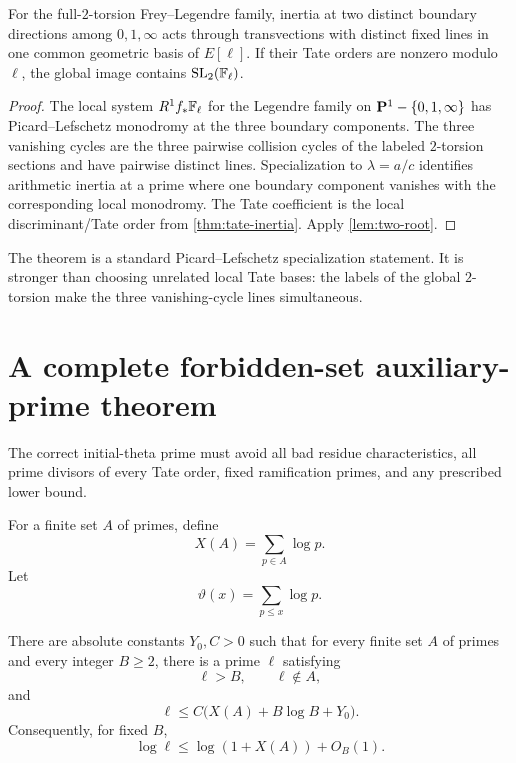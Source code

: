 \begin{theorem}\label{thm:legendre-two-place}
For the full-$2$-torsion Frey--Legendre family, inertia at two distinct boundary directions among $0,1,\infty$ acts through transvections with distinct fixed lines in one common geometric basis of $E[\ell]$.  If their Tate orders are nonzero modulo $\ell$, the global image contains $\operatorname{SL}_2(\mathbb F_\ell)$.
\end{theorem}

\begin{proof}
The local system $R^1f_\ast\mathbb F_\ell$ for the Legendre family on $\mathbf P^1-\{0,1,\infty\}$ has Picard--Lefschetz monodromy at the three boundary components.  The three vanishing cycles are the three pairwise collision cycles of the labeled $2$-torsion sections and have pairwise distinct lines.  Specialization to $\lambda=a/c$ identifies arithmetic inertia at a prime where one boundary component vanishes with the corresponding local monodromy.  The Tate coefficient is the local discriminant/Tate order from \cref{thm:tate-inertia}.  Apply \cref{lem:two-root}.
\end{proof}

\begin{remark}
The theorem is a standard Picard--Lefschetz specialization statement.  It is stronger than choosing unrelated local Tate bases: the labels of the global $2$-torsion make the three vanishing-cycle lines simultaneous.
\end{remark}

\section{A complete forbidden-set auxiliary-prime theorem}

The correct initial-theta prime must avoid all bad residue characteristics, all prime divisors of every Tate order, fixed ramification primes, and any prescribed lower bound.

\begin{definition}
For a finite set $A$ of primes, define
\[
 X(A)=\sum_{p\in A}\log p.
\]
Let
\[
 \vartheta(x)=\sum_{p\le x}\log p.
\]
\end{definition}

\begin{theorem}\label{thm:mass-escape}
There are absolute constants $Y_0,C>0$ such that for every finite set $A$ of primes and every integer $B\ge2$, there is a prime $\ell$ satisfying
\[
 \ell>B,\qquad \ell\notin A,
\]
and
\[
 \ell\le C\bigl(X(A)+B\log B+Y_0\bigr).
\]
Consequently, for fixed $B$,
\[
 \log\ell\le \log(1+X(A))+O_B(1).
\]
\end{theorem}

